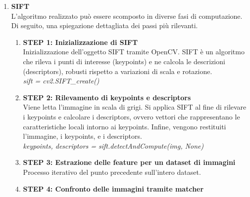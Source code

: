 \documentclass[12pt,a4paper,openright,twoside]{book}
\begin{document}
\begin{enumerate}
\item \textbf{SIFT}\\
L'algoritmo realizzato può essere scomposto in diverse fasi di computazione. Di seguito, una spiegazione dettagliata dei passi più rilevanti.
\begin{enumerate}

\item \textbf{STEP 1: Inizializzazione di SIFT}\\
Inizializzazione dell'oggetto SIFT tramite OpenCV. SIFT è un algoritmo che rileva i punti di interesse (keypoints) e ne calcola le descrizioni (descriptors), robusti rispetto a variazioni di scala e rotazione.\\

{\itshape sift = cv2.SIFT\_create()}\\

\item \textbf{STEP 2: Rilevamento di keypoints e descriptors}\\
Viene letta l'immagine in scala di grigi. Si applica SIFT al fine di rilevare i keypoints  e calcolare i descriptors, ovvero vettori che rappresentano le caratteristiche locali intorno ai keypoints. Infine, vengono restituiti l'immagine, i keypoints, e i descriptors.\\

{\itshape keypoints, descriptors = sift.detectAndCompute(img, None)}\\

\item \textbf{STEP 3: Estrazione delle feature per un dataset di immagini}\\
Processo iterativo del punto precedente sull'intero dataset.

\item \textbf{STEP 4: Confronto delle immagini tramite matcher}\\

\begin{figure}[H]
    \centering
    
\end{figure}


\end{enumerate}
\end{enumerate}
\end{document}
